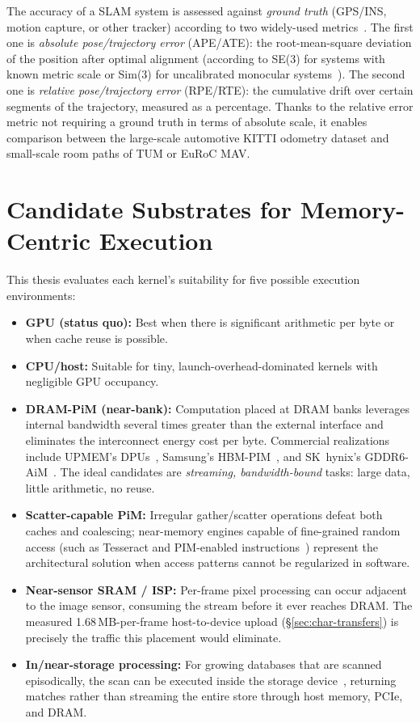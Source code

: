 The accuracy of a SLAM system is assessed against \emph{ground truth} (GPS/INS, motion capture, or other tracker) according to two widely-used metrics~\cite{sturm2012tum,zhang2018tutorial}. The first one is \emph{absolute pose/trajectory error} (APE/ATE): the root-mean-square deviation of the position after optimal alignment (according to SE(3) for systems with known metric scale or Sim(3) for uncalibrated monocular systems~\cite{umeyama1991}). The second one is \emph{relative pose/trajectory error} (RPE/RTE): the cumulative drift over certain segments of the trajectory, measured as a percentage. Thanks to the relative error metric not requiring a ground truth in terms of absolute scale, it enables comparison between the large-scale automotive KITTI odometry dataset and small-scale room paths of TUM or EuRoC MAV.

\section{Candidate Substrates for Memory-Centric Execution}
\label{sec:bg-substrates}

This thesis evaluates each kernel's suitability for five possible execution environments:

\begin{itemize}
\item \textbf{GPU (status quo):} Best when there is significant arithmetic per byte or when cache reuse is possible.
\item \textbf{CPU/host:} Suitable for tiny, launch-overhead-dominated kernels with negligible GPU occupancy.
\item \textbf{DRAM-PiM (near-bank):} Computation placed at DRAM banks leverages internal bandwidth several times greater than the external interface and eliminates the interconnect energy cost per byte. Commercial realizations include UPMEM's DPUs~\cite{gomezluna2021upmem}, Samsung's HBM-PIM~\cite{kwon2021hbmpim}, and SK~hynix's GDDR6-AiM~\cite{lee2022aim}. The ideal candidates are \emph{streaming, bandwidth-bound} tasks: large data, little arithmetic, no reuse.
\item \textbf{Scatter-capable PiM:} Irregular gather/scatter operations defeat both caches and coalescing; near-memory engines capable of fine-grained random access (such as Tesseract and PIM-enabled instructions~\cite{ahn2015tesseract,ahn2015pei}) represent the architectural solution when access patterns cannot be regularized in software.
\item \textbf{Near-sensor SRAM / ISP:} Per-frame pixel processing can occur adjacent to the image sensor, consuming the stream before it ever reaches DRAM. The measured 1.68\,MB-per-frame host-to-device upload (\S\ref{sec:char-transfers}) is precisely the traffic this placement would eliminate.
\item \textbf{In/near-storage processing:} For growing databases that are scanned episodically, the scan can be executed inside the storage device~\cite{do2013smartssd,gu2016biscuit}, returning matches rather than streaming the entire store through host memory, PCIe, and DRAM.
\end{itemize}


